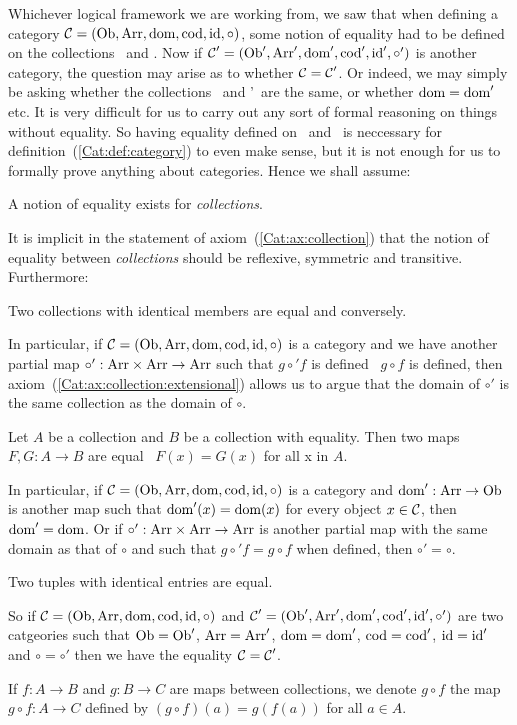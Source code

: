 Whichever logical framework we are working from, we saw that when defining
a category $\mbox{$\cal C$}=(\mbox{\rm Ob}, \mbox{\rm Arr}, \mbox{\rm dom}, \mbox{\rm cod}, \mbox{\rm id}, \circ)$, some notion of
equality had to be defined on the collections \ob\ and \arr. Now if
$\mbox{$\cal C$}'=(\mbox{\rm Ob}', \mbox{\rm Arr}', \mbox{\rm dom}', \mbox{\rm cod}', \mbox{\rm id}', \circ')$ is another category,
the question may arise as to whether $\mbox{$\cal C$}=\mbox{$\cal C$}'$. Or indeed, we may 
simply be asking whether the collections \ob\ and \ob'\ are the same,
or whether $\mbox{\rm dom}=\mbox{\rm dom}'$ etc. It is very difficult for us to carry out
any sort of formal reasoning on things without equality. So having
equality defined on \ob\ and \arr\ is neccessary for
definition~(\ref{Cat:def:category}) to even make sense, but it is not
enough for us to formally prove anything about categories. Hence we shall
assume:

\begin{axiom}\label{Cat:ax:collection}
    A notion of equality exists for {\em collections}.
\end{axiom}

\noindent
It is implicit in the statement of axiom~(\ref{Cat:ax:collection})
that the notion of equality between {\em collections} should 
be reflexive, symmetric and transitive. Furthermore:

\begin{axiom}\label{Cat:ax:collection:extensional}
    Two collections with identical members are equal and conversely.
\end{axiom}
In particular, if $\mbox{$\cal C$}=(\mbox{\rm Ob}, \mbox{\rm Arr}, \mbox{\rm dom}, \mbox{\rm cod}, \mbox{\rm id}, \circ)$ is
a category and we have another partial map $\circ':\mbox{\rm Arr}\times\mbox{\rm Arr}\to\mbox{\rm Arr}$ 
such that $g\circ' f$ is defined \ifand\ $g\circ f$ is defined,
then axiom~(\ref{Cat:ax:collection:extensional}) allows us to argue 
that the domain of $\circ'$ is the same collection as the domain
of $\circ$.

\begin{axiom}\label{Cat:ax:map:extensional}
    Let $A$ be a collection and $B$ be a collection with equality.
    Then two maps $F,G:A\to B$ are equal \ifand\ $F(x)=G(x)$ for all x in $A$.
\end{axiom}
In particular, if $\mbox{$\cal C$}=(\mbox{\rm Ob}, \mbox{\rm Arr}, \mbox{\rm dom}, \mbox{\rm cod}, \mbox{\rm id}, \circ)$ is a 
category and $\mbox{\rm dom}':\mbox{\rm Arr}\to\mbox{\rm Ob}$ is another map such that $\mbox{\rm dom}'(x)=\mbox{\rm dom}(x)$
for every object $x\in\mbox{$\cal C$}$, then $\mbox{\rm dom}'=\mbox{\rm dom}$. Or if $\circ':\mbox{\rm Arr}\times\mbox{\rm Arr}\to\mbox{\rm Arr}$ 
is another partial map  with the same domain as that of $\circ$ and such that 
$g\circ' f = g\circ f$ when defined, then $\circ'=\circ$.

\begin{axiom}\label{Cat:ax:tuple:extensional}
    Two tuples with identical entries are equal.
\end{axiom}
So if $\mbox{$\cal C$}=(\mbox{\rm Ob}, \mbox{\rm Arr}, \mbox{\rm dom}, \mbox{\rm cod}, \mbox{\rm id}, \circ)$ and
$\mbox{$\cal C$}'=(\mbox{\rm Ob}', \mbox{\rm Arr}', \mbox{\rm dom}', \mbox{\rm cod}', \mbox{\rm id}', \circ')$ are two catgeories
such that $\mbox{\rm Ob}=\mbox{\rm Ob}'$, $\mbox{\rm Arr}=\mbox{\rm Arr}'$, $\mbox{\rm dom}=\mbox{\rm dom}'$, $\mbox{\rm cod}=\mbox{\rm cod}'$,
$\mbox{\rm id}=\mbox{\rm id}'$ and $\circ=\circ'$ then we have the equality $\mbox{$\cal C$}=\mbox{$\cal C$}'$.

\begin{notation}\label{Cat:ax:composition}
    If $f:A\to B$ and $g:B\to C$ are maps between collections,
    we denote $g\circ f$ the map $g\circ f:A\to C$ defined by 
    $(g\circ f)(a) = g(f(a))$ for all $a\in A$.
\end{notation}
